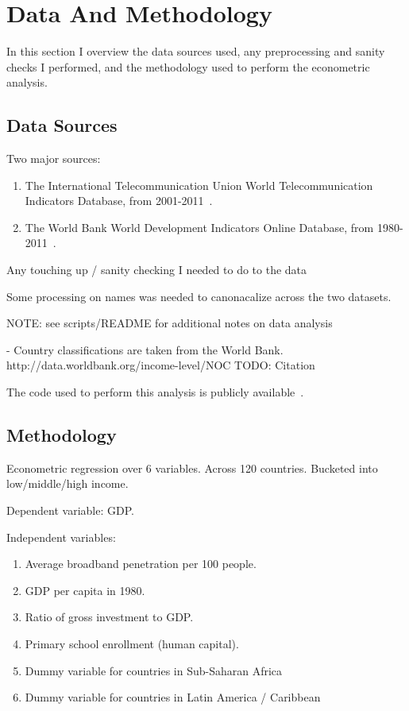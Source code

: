 \section{Data And Methodology}
\label{sec:data_and_methodology}

In this section I overview the data sources used, any preprocessing and sanity
checks I performed, and the methodology used to perform the econometric
analysis.

\subsection{Data Sources}

Two major sources:
\begin{enumerate}
\item The International Telecommunication Union World Telecommunication Indicators
Database, from 2001-2011~\cite{itu}.
\item The World Bank World Development Indicators Online Database, from
1980-2011~\cite{wdi}.
\end{enumerate}

Any touching up / sanity checking I needed to do to the data

Some processing on names was needed to canonacalize across the two datasets.

NOTE: see scripts/README for additional notes on data analysis

- Country classifications are taken from the World
Bank. http://data.worldbank.org/income-level/NOC
TODO: Citation

The code used to perform this analysis is publicly available~\cite{github}.

\subsection{Methodology}

Econometric regression over 6 variables.
Across 120 countries.
Bucketed into low/middle/high income.

Dependent variable: GDP.

Independent variables:
\begin{enumerate}
\item Average broadband penetration per 100 people.
\item GDP per capita in 1980.
\item Ratio of gross investment to GDP.
\item Primary school enrollment (human capital).
\item Dummy variable for countries in Sub-Saharan Africa
\item Dummy variable for countries in Latin America / Caribbean
\end{enumerate}

